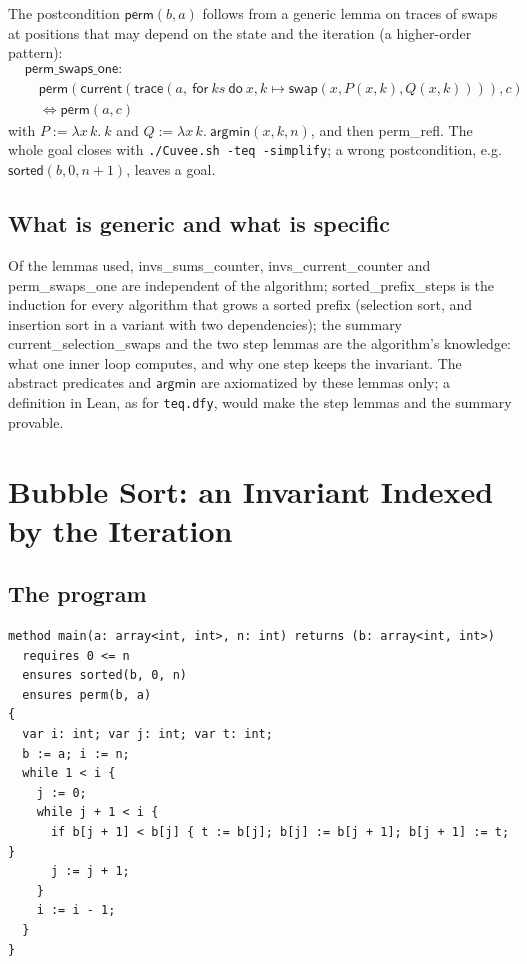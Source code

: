 \documentclass[11pt,a4paper]{article}
\newcommand{\tr}[3]{\mathsf{trace}(#1,\ \mathsf{for}\ #2\ \mathsf{do}\ #3)}
\newcommand{\cur}{\mathsf{current}}
\newcommand{\sorted}{\mathsf{sorted}}
\newcommand{\perm}{\mathsf{perm}}
\newcommand{\argmin}{\mathsf{argmin}}
\newcommand{\swap}[3]{\mathsf{swap}(#1, #2, #3)}
\newcommand{\lemma}[1]{\textsf{#1}}
\begin{document}
The postcondition $\perm(b, a)$ follows from a generic lemma on traces of swaps at positions that may
depend on the state and the iteration (a higher-order pattern):
\begin{align*}
  &\lemma{perm\_swaps\_one}:\\
  &\quad \perm(\cur(\tr{a}{ks}{x, k \mapsto \swap{x}{P(x, k)}{Q(x, k)}}), c)\\
  &\quad\Longleftrightarrow \perm(a, c)
\end{align*}
with $P := \lambda x\, k.\ k$ and $Q := \lambda x\, k.\ \argmin(x, k, n)$, and then \lemma{perm\_refl}.
The whole goal closes with \texttt{./Cuvee.sh -teq -simplify}; a wrong postcondition, e.g.
$\sorted(b, 0, n + 1)$, leaves a goal.

\subsection{What is generic and what is specific}

Of the lemmas used, \lemma{invs\_sums\_counter}, \lemma{invs\_current\_counter} and
\lemma{perm\_swaps\_one} are independent of the algorithm; \lemma{sorted\_prefix\_steps} is the
induction for every algorithm that grows a sorted prefix (selection sort, and insertion sort in a
variant with two dependencies); the summary \lemma{current\_selection\_swaps} and the two step lemmas are the
algorithm's knowledge: what one inner loop computes, and why one step keeps the invariant. The abstract
predicates and $\argmin$ are axiomatized by these lemmas only; a definition in Lean, as for
\texttt{teq.dfy}, would make the step lemmas and the summary provable.


\section{Bubble Sort: an Invariant Indexed by the Iteration}

\subsection{The program}
\begin{lstlisting}
method main(a: array<int, int>, n: int) returns (b: array<int, int>)
  requires 0 <= n
  ensures sorted(b, 0, n)
  ensures perm(b, a)
{
  var i: int; var j: int; var t: int;
  b := a; i := n;
  while 1 < i {
    j := 0;
    while j + 1 < i {
      if b[j + 1] < b[j] { t := b[j]; b[j] := b[j + 1]; b[j + 1] := t; }
      j := j + 1;
    }
    i := i - 1;
  }
}
\end{lstlisting}
\end{document}

